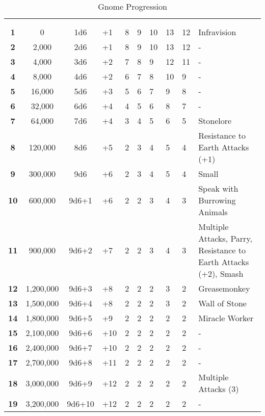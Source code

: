 \begin {table}[H]
  \caption{Gnome Progression}
	\begin{tabularx}{\columnwidth}{>{\bfseries}cccM{.31in}M{.51in}M{.25in}M{.43in}M{.32in}M{.45in}Y}
    \thead{}&\thead{}&\thead{}&\thead{}&\thead{}&\setcounter{rownum}{0}\\
     &  &  &  &  &  &  &  &  & \\
		1 & 0 & 1d6 & +1 & 8 & 9 & 10 & 13 & 12 & Infravision\\
		2 & 2,000 & 2d6 & +1 & 8 & 9 & 10 & 13 & 12 & -\\
		3 & 4,000 & 3d6 & +2 & 7 & 8 & 9 & 12 & 11 & -\\
		4 & 8,000 & 4d6 & +2 & 6 & 7 & 8 & 10 & 9 & -\\
		5 & 16,000 & 5d6 & +3 & 5 & 6 & 7 & 9 & 8 & -\\
		6 & 32,000 & 6d6 & +4 & 4 & 5 & 6 & 8 & 7 & -\\
		7 & 64,000 & 7d6 & +4 & 3 & 4 & 5 & 6 & 5 & Stonelore\\
		8 & 120,000 & 8d6 & +5 & 2 & 3 & 4 & 5 & 4 & Resistance to Earth Attacks (+1)\\
		9 & 300,000 & 9d6 & +6 & 2 & 3 & 4 & 5 & 4 & Small\\
		10 & 600,000 & 9d6+1 & +6 & 2 & 2 & 3 & 4 & 3 & Speak with Burrowing Animals\\
		11 & 900,000 & 9d6+2 & +7 & 2 & 2 & 3 & 4 & 3 & Multiple Attacks, Parry, Resistance to Earth Attacks (+2), Smash\\
		12 & 1,200,000 & 9d6+3 & +8 & 2 & 2 & 2 & 3 & 2 & Greasemonkey\\
		13 & 1,500,000 & 9d6+4 & +8 & 2 & 2 & 2 & 3 & 2 & Wall of Stone\\
		14 & 1,800,000 & 9d6+5 & +9 & 2 & 2 & 2 & 2 & 2 & Miracle Worker\\
		15 & 2,100,000 & 9d6+6 & +10 & 2 & 2 & 2 & 2 & 2 & -\\
		16 & 2,400,000 & 9d6+7 & +10 & 2 & 2 & 2 & 2 & 2 & -\\
		17 & 2,700,000 & 9d6+8 & +11 & 2 & 2 & 2 & 2 & 2 & -\\
		18 & 3,000,000 & 9d6+9 & +12 & 2 & 2 & 2 & 2 & 2 & Multiple Attacks (3)\\
		19 & 3,200,000 & 9d6+10 & +12 & 2 & 2 & 2 & 2 & 2 & -\\

\end{tabularx}
\end{table}
